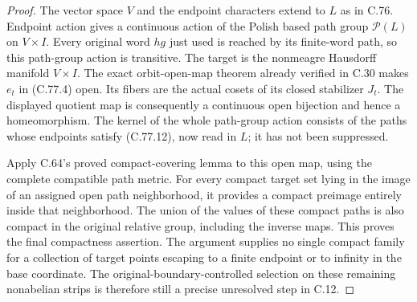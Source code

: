 \begin{proof}
The vector space $V$ and the endpoint characters
extend to $L$ as in C.76. Endpoint action gives a
continuous action of the Polish based path group
$\mathscr P(L)$ on $V\times I$. Every original word
$hg$ just used is reached by its finite-word path,
so this path-group action is transitive. The target
is the nonmeagre Hausdorff manifold $V\times I$.
The exact orbit-open-map theorem already verified
in C.30 makes $e_t$ in (C.77.4) open. Its fibers
are the actual cosets of its closed stabilizer
$J_t$. The displayed quotient map is consequently
a continuous open bijection and hence a homeomorphism.
The kernel of the whole path-group action consists
of the paths whose endpoints satisfy (C.77.12),
now read in $L$; it has not been suppressed.

Apply C.64's proved compact-covering lemma to this
open map, using the complete compatible path metric.
For every compact target set lying in the image of
an assigned open path neighborhood, it provides
a compact preimage entirely inside that neighborhood.
The union of the values of these compact paths is
also compact in the original relative group, including
the inverse maps. This proves the final compactness
assertion. The argument supplies no single compact
family for a collection of target points escaping
to a finite endpoint or to infinity in the base
coordinate. The original-boundary-controlled selection
on these remaining nonabelian strips is therefore
still a precise unresolved step in C.12.
\end{proof}
